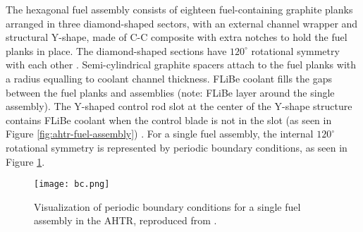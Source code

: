 The hexagonal fuel assembly consists of eighteen fuel-containing graphite planks 
arranged in three diamond-shaped sectors, with an external channel wrapper and 
structural Y-shape, made of C-C composite with extra notches to hold the fuel 
planks in place. 
The diamond-shaped sections have $120^\circ{}$ rotational symmetry with each other 
\cite{varma_ahtr_2012,ramey_monte_2018,petrovic_benchmark_2021}. 
Semi-cylindrical graphite spacers attach to the fuel planks with a radius equalling to 
coolant channel thickness. 
\gls{FLiBe} coolant fills the gaps between the fuel planks and
assemblies (note: \gls{FLiBe} layer around the single assembly). 
The Y-shaped control rod slot at the center of the Y-shape structure contains 
\gls{FLiBe} coolant when the control blade is not in the slot (as seen in 
Figure \ref{fig:ahtr-fuel-assembly})
\cite{varma_ahtr_2012,ramey_monte_2018,petrovic_benchmark_2021}.
For a single fuel assembly, the internal $120^\circ{}$ rotational symmetry is 
represented by periodic boundary conditions, as seen in Figure \ref{fig:bc}. 
\begin{figure}[htbp]
    \centering
    \texttt{[image: bc.png]} 
    \caption{Visualization of periodic boundary conditions for a single fuel 
    assembly in the \acrfull{AHTR}, reproduced from \cite{petrovic_benchmark_2021}.}
    \label{fig:bc}
\end{figure}

